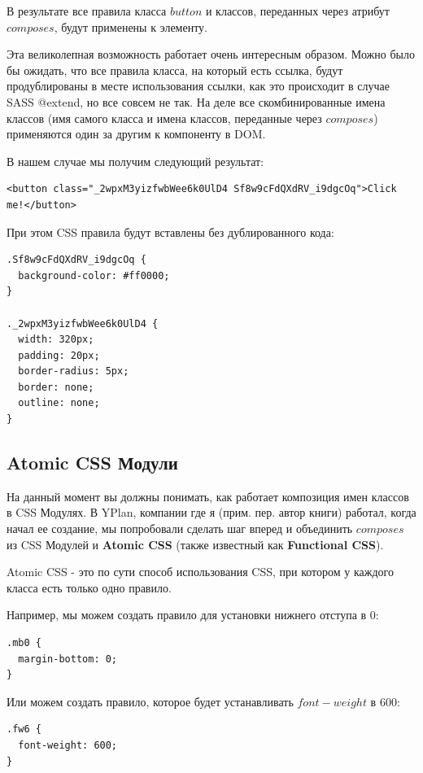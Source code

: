 В результате все правила класса $button$ и классов, переданных через атрибут $composes$, будут применены к элементу.

Эта великолепная возможность работает очень интересным образом. Можно было бы ожидать, что все правила класса, на который есть ссылка, будут продублированы в месте использования ссылки, как это происходит в случае SASS @extend, но все совсем не так. На деле все скомбинированные имена классов (имя самого класса и имена классов, переданные через $composes$) применяются один за другим к компоненту в DOM.

В нашем случае мы получим следующий результат:

\begin{lstlisting}
<button class="_2wpxM3yizfwbWee6k0UlD4 Sf8w9cFdQXdRV_i9dgcOq">Click me!</button>
\end{lstlisting}

При этом CSS правила будут вставлены без дублированного кода:

\begin{lstlisting}
.Sf8w9cFdQXdRV_i9dgcOq {
  background-color: #ff0000;
}

._2wpxM3yizfwbWee6k0UlD4 {
  width: 320px;
  padding: 20px;
  border-radius: 5px;
  border: none;
  outline: none;
}
\end{lstlisting}

\subsection{Atomic CSS Модули}

На данный момент вы должны понимать, как работает композиция имен классов в CSS Модулях. В YPlan, компании где я (прим. пер. автор книги) работал, когда начал ее создание, мы попробовали сделать шаг вперед и объединить $composes$ из CSS Модулей и \textbf{Atomic CSS} (также известный как \textbf{Functional CSS}).

Atomic CSS - это по сути способ использования CSS, при котором у каждого класса есть только одно правило.

Например, мы можем создать правило для установки нижнего отступа в $0$:

\begin{lstlisting}
.mb0 {
  margin-bottom: 0;
}
\end{lstlisting}

Или можем создать правило, которое будет устанавливать $font-weight$ в $600$:

\begin{lstlisting}
.fw6 {
  font-weight: 600;
}
\end{lstlisting}

